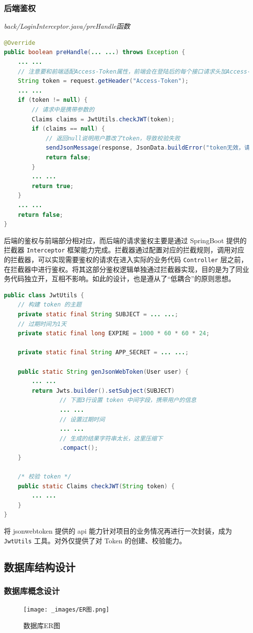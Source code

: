 \subsubsection{后端鉴权}
\noindent\textit{back/LoginInterceptor.java/preHandle函数}
\begin{lstlisting}[language=Java]
@Override
public boolean preHandle(... ...) throws Exception {
    ... ...
    // 注意要和前端适配Access-Token属性，前端会在登陆后的每个接口请求头加Access-Token属性
    String token = request.getHeader("Access-Token");
    ... ...
    if (token != null) {
        // 请求中是携带参数的
        Claims claims = JwtUtils.checkJWT(token);
        if (claims == null) {
            // 返回null说明用户篡改了token，导致校验失败
            sendJsonMessage(response, JsonData.buildError("token无效，请重新登录"));
            return false;
        }
        ... ...
        return true;
    }
    ... ...
    return false;
}
\end{lstlisting}
后端的鉴权与前端部分相对应，而后端的请求鉴权主要是通过 SpringBoot 提供的拦截器 \lstinline!Interceptor! 框架能力完成。拦截器通过配置对应的拦截规则，调用对应的拦截器，可以实现需要鉴权的请求在进入实际的业务代码 \lstinline!Controller! 层之前，在拦截器中进行鉴权。将其这部分鉴权逻辑单独通过拦截器实现，目的是为了同业务代码独立开，互相不影响。如此的设计，也是遵从了“低耦合”的原则思想。
\begin{lstlisting}[language=Java]
public class JwtUtils {
    // 构建 token 的主题
    private static final String SUBJECT = ... ...;
    // 过期时间为1天
    private static final long EXPIRE = 1000 * 60 * 60 * 24;

    private static final String APP_SECRET = ... ...;

    public static String genJsonWebToken(User user) {
        ... ...
        return Jwts.builder().setSubject(SUBJECT)
                // 下面3行设置 token 中间字段，携带用户的信息
                ... ...
                // 设置过期时间
                ... ...
                // 生成的结果字符串太长，这里压缩下
                .compact();
    }

    /* 校验 token */
    public static Claims checkJWT(String token) {
        ... ...
    }
}
\end{lstlisting}

将 jsonwebtoken 提供的 api 能力针对项目的业务情况再进行一次封装，成为 \lstinline!JwtUtils! 工具。对外仅提供了对 Token 的创建、校验能力。

\subsection{数据库结构设计}
\subsubsection{数据库概念设计}
\begin{figure}[htb]
    \centering
    \texttt{[image: \_images/ER图.png]}
    \caption{数据库ER图}
\end{figure}